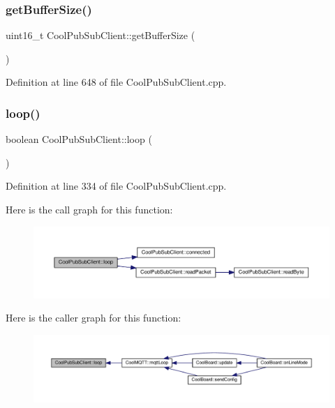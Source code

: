 \subsubsection{\texorpdfstring{get\+Buffer\+Size()}{getBufferSize()}}
{\footnotesize\ttfamily uint16\+\_\+t Cool\+Pub\+Sub\+Client\+::get\+Buffer\+Size (\begin{DoxyParamCaption}{ }\end{DoxyParamCaption})}



Definition at line 648 of file Cool\+Pub\+Sub\+Client.\+cpp.

\mbox{\label{class_cool_pub_sub_client_afc15900f0fc4886a19394508e61793b8}} 
\subsubsection{\texorpdfstring{loop()}{loop()}}
{\footnotesize\ttfamily boolean Cool\+Pub\+Sub\+Client\+::loop (\begin{DoxyParamCaption}{ }\end{DoxyParamCaption})}



Definition at line 334 of file Cool\+Pub\+Sub\+Client.\+cpp.

Here is the call graph for this function\+:
\nopagebreak
\begin{figure}[H]
\begin{center}
\leavevmode
\includegraphics[width=350pt]{class_cool_pub_sub_client_afc15900f0fc4886a19394508e61793b8_cgraph}
\end{center}
\end{figure}
Here is the caller graph for this function\+:
\nopagebreak
\begin{figure}[H]
\begin{center}
\leavevmode
\includegraphics[width=350pt]{class_cool_pub_sub_client_afc15900f0fc4886a19394508e61793b8_icgraph}
\end{center}
\end{figure}
\mbox{\label{class_cool_pub_sub_client_ab6ad5fa2d3db8f91454027257f225a89}} 
